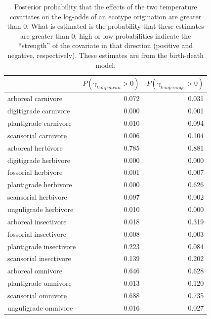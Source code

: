 \documentclass[12pt,letterpaper]{article}
\begin{document}
\begin{table}[ht]
  \centering
  \caption[Posterior probablity of effects of temperature on origination]{Posterior probability that the effects of the two temperature covariates on the log-odds of an ecotype origination are greater than 0. What is estimated is the probability that these estimates are greater than 0; high or low probabilities indicate the ``strength'' of the covariate in that direction (positive and negative, respectively). These estimates are from the birth-death model.}
  \label{tab:origin_temp}
  \begin{tabular}{ l r r }
    \hline
    & \(P(\gamma_{temp\ mean} > 0)\) & \(P(\gamma_{temp\ range} > 0)\) \\ 
    \hline
    arboreal carnivore & 0.072 & 0.031 \\ 
    digitigrade carnivore & 0.000 & 0.001 \\ 
    plantigrade carnivore & 0.010 & 0.094 \\ 
    scansorial carnivore & 0.006 & 0.104 \\ 
    arboreal herbivore & 0.785 & 0.881 \\ 
    digitigrade herbivore & 0.000 & 0.000 \\ 
    fossorial herbivore & 0.001 & 0.007 \\ 
    plantigrade herbivore & 0.000 & 0.626 \\ 
    scansorial herbivore & 0.097 & 0.002 \\ 
    unguligrade herbivore & 0.010 & 0.000 \\ 
    arboreal insectivore & 0.018 & 0.319 \\ 
    fossorial insectivore & 0.008 & 0.003 \\ 
    plantigrade insectivore & 0.223 & 0.084 \\ 
    scansorial insectivore & 0.139 & 0.202 \\ 
    arboreal omnivore & 0.646 & 0.628 \\ 
    plantigrade omnivore & 0.013 & 0.120 \\ 
    scansorial omnivore & 0.688 & 0.735 \\ 
    unguligrade omnivore & 0.016 & 0.027 \\ 
    \hline
  \end{tabular}
\end{table}
\end{document}
